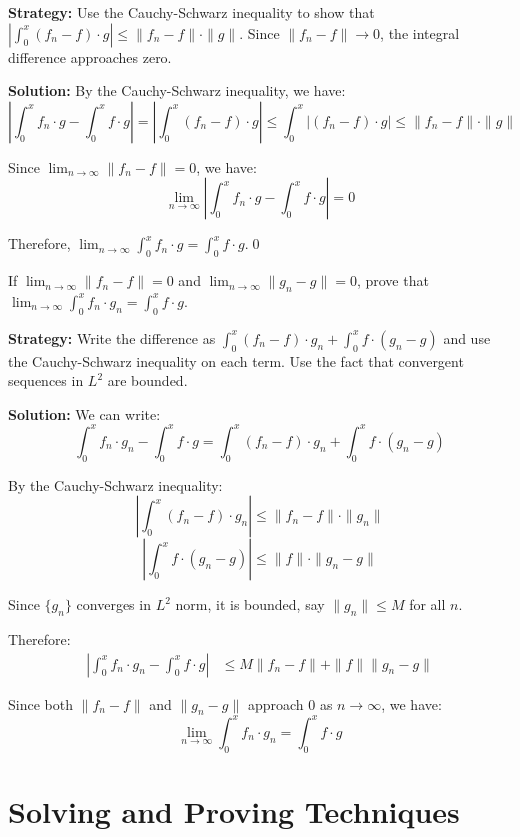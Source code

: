 \noindent\textbf{Strategy:} Use the Cauchy-Schwarz inequality to show that $|\int_0^x (f_n - f) \cdot g| \leq \| f_n - f \| \cdot \| g \|$. Since $\| f_n - f \| \to 0$, the integral difference approaches zero.

\bigskip\noindent\textbf{Solution:}
By the Cauchy-Schwarz inequality, we have:
\[\left|\int_0^x f_n \cdot g - \int_0^x f \cdot g\right| = \left|\int_0^x (f_n - f) \cdot g\right| \leq \int_0^x |(f_n - f) \cdot g| \leq \| f_n - f \| \cdot \| g \|\]

Since $\lim_{n \to \infty} \| f_n - f \| = 0$, we have:
\[\lim_{n \to \infty} \left|\int_0^x f_n \cdot g - \int_0^x f \cdot g\right| = 0\]

Therefore, $\lim_{n \to \infty} \int_0^x f_n \cdot g = \int_0^x f \cdot g$.\qed


\begin{problembox}
If $\lim_{n \to \infty} \| f_n - f \| = 0$ and $\lim_{n \to \infty} \| g_n - g \| = 0$, prove that $\lim_{n \to \infty} \int_0^x f_n \cdot g_n = \int_0^x f \cdot g$.
\end{problembox}

\noindent\textbf{Strategy:} Write the difference as $\int_0^x (f_n - f) \cdot g_n + \int_0^x f \cdot (g_n - g)$ and use the Cauchy-Schwarz inequality on each term. Use the fact that convergent sequences in $L^2$ are bounded.

\bigskip\noindent\textbf{Solution:}
We can write:
\[\int_0^x f_n \cdot g_n - \int_0^x f \cdot g = \int_0^x (f_n - f) \cdot g_n + \int_0^x f \cdot (g_n - g)\]

By the Cauchy-Schwarz inequality:
\[\left|\int_0^x (f_n - f) \cdot g_n\right| \leq \| f_n - f \| \cdot \| g_n \|\]
\[\left|\int_0^x f \cdot (g_n - g)\right| \leq \| f \| \cdot \| g_n - g \|\]

Since $\{g_n\}$ converges in $L^2$ norm, it is bounded, say $\| g_n \| \leq M$ for all $n$.

Therefore:
\begin{align*}
\left|\int_0^x f_n \cdot g_n - \int_0^x f \cdot g\right| &\leq M \| f_n - f \| + \| f \| \| g_n - g \|
\end{align*}

Since both $\| f_n - f \|$ and $\| g_n - g \|$ approach 0 as $n \to \infty$, we have:
\[\lim_{n \to \infty} \int_0^x f_n \cdot g_n = \int_0^x f \cdot g\]

\section{Solving and Proving Techniques}

